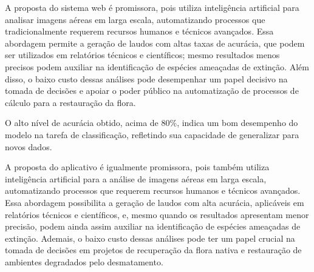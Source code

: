 A proposta do sistema web é promissora, pois utiliza inteligência artificial para analisar imagens aéreas em larga escala, automatizando processos que tradicionalmente requerem recursos humanos e técnicos avançados. Essa abordagem permite a geração de laudos com altas taxas de acurácia, que podem ser utilizados em relatórios técnicos e científicos; mesmo resultados menos precisos podem auxiliar na identificação de espécies ameaçadas de extinção. Além disso, o baixo custo dessas análises pode desempenhar um papel decisivo na tomada de decisões e apoiar o poder público na automatização de processos de cálculo para a restauração da flora.

O alto nível de acurácia obtido, acima de 80\%, indica um bom desempenho do modelo na tarefa de classificação, refletindo sua capacidade de generalizar para novos dados.

A proposta do aplicativo é igualmente promissora, pois também utiliza inteligência artificial para a análise de imagens aéreas em larga escala, automatizando processos que requerem recursos humanos e técnicos avançados. Essa abordagem possibilita a geração de laudos com alta acurácia, aplicáveis em relatórios técnicos e científicos, e, mesmo quando os resultados apresentam menor precisão, podem ainda assim auxiliar na identificação de espécies ameaçadas de extinção. Ademais, o baixo custo dessas análises pode ter um papel crucial na tomada de decisões em projetos de recuperação da flora nativa e restauração de ambientes degradados pelo desmatamento.